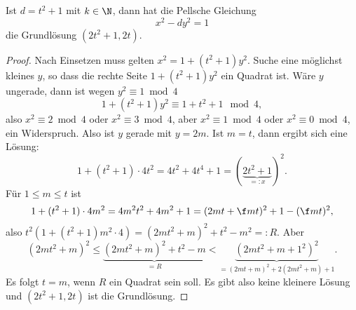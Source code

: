 \begin{st} \label{4.23}
	Ist $d = t^2 + 1$ mit $k \in \N$, dann hat die Pellsche Gleichung
	\[
		x^2 - dy^2 = 1
	\]
	die Grundlösung $(2t^2 + 1, 2t)$.
	\begin{proof}
		Nach Einsetzen muss gelten $x^2 = 1 + (t^2 + 1)y^2$.
		Suche eine möglichst kleines $y$, so dass die rechte Seite $1 + (t^2 + 1)y^2$ ein Quadrat ist.
		Wäre $y$ ungerade, dann ist wegen $y^2 \equiv 1 \bmod 4$
		\[
			1 + (t^2 + 1)y^2
			\equiv 1 + t^2 + 1 \mod 4,
		\]
		also $x^2 \equiv 2 \bmod 4$ oder $x^2 \equiv 3 \bmod 4$, aber $x^2 \equiv 1 \bmod 4$ oder $x^2 \equiv 0 \bmod 4$, ein Widerspruch.
		Also ist $y$ gerade mit $y = 2m$.
		Ist $m = t$, dann ergibt sich eine Lösung:
		\[
			1 + (t^2 + 1)\cdot 4t^2
			= 4t^2 + 4t^4 + 1
			= (\underbrace{2t^2 + 1}_{=:x})^2.
		\]
		Für $1 \le m \le t$ ist
		\[
			1 + (t^2 + 1)\cdot 4m^2
			= 4m^2 t^2 + 4m^2 + 1
			= (2mt + \f mt)^2 + 1 - (\f mt)^2,
		\]
		also $t^2(1 + (t^2 + 1)m^2\cdot 4) = (2mt^2 + m)^2 + t^2 - m^2 =: R$.
		Aber
		\[
			(2mt^2 + m)^2
			\le \underbrace{(2mt^2 + m)^2 + t^2 - m}_{=R}
			< \underbrace{(2mt^2 + m + 1^2)^2}_{= (2mt + m)^2 + 2(2mt^2 + m) + 1}.
		\]
		Es folgt $t = m$, wenn $R$ ein Quadrat sein soll.
		Es gibt also keine kleinere Lösung und $(2t^2 + 1, 2t)$ ist die Grundlösung.
	\end{proof}
\end{st}
